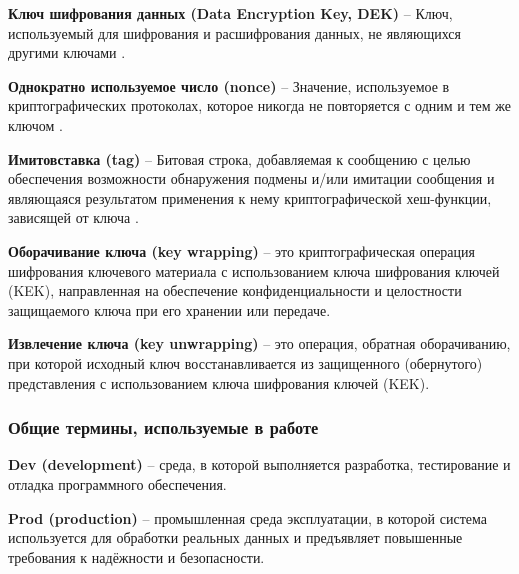 \documentclass[14pt, a4paper]{extarticle}
\newcommand{\addsubsubsection}[1]{\refstepcounter{subsubsection}\addcontentsline{toc}{subsubsection}{\protect\numberline{\thesubsubsection}#1}}
\begin{document}
	\textbf{Ключ шифрования данных (Data Encryption Key, DEK)} -- Ключ, используемый для шифрования и расшифрования данных, не являющихся другими ключами \cite{NIST_SP_800-57_Part_1_Rev._5}.
%	 

	\textbf{Однократно используемое число (nonce)} -- Значение, используемое в криптографических протоколах, которое никогда не повторяется с одним и тем же ключом \cite{GOST_R_34.14.2025}.
	
	\textbf{Имитовставка (tag)} -- Битовая строка, добавляемая к сообщению с целью обеспечения возможности обнаружения подмены и/или имитации сообщения и являющаяся результатом применения к нему криптографической хеш-функции, зависящей от ключа \cite{GOST_R_34.14.2025}.
	
	\textbf{Оборачивание ключа (key wrapping)} -- это криптографическая операция шифрования ключевого материала с использованием ключа шифрования ключей (KEK), направленная на обеспечение конфиденциальности и целостности защищаемого ключа при его хранении или передаче.
	
	\textbf{Извлечение ключа (key unwrapping)} -- это операция, обратная оборачиванию, при которой исходный ключ восстанавливается из защищенного (обернутого) представления с использованием ключа шифрования ключей (KEK).
		
	\subsubsection{Общие термины, используемые в работе}
	
	\textbf{Dev (development)} -- среда, в которой выполняется разработка, тестирование и отладка программного обеспечения.
	
	\textbf{Prod (production)} -- промышленная среда эксплуатации, в которой система используется для обработки реальных данных и предъявляет повышенные требования к надёжности и безопасности.
	
\end{document}
